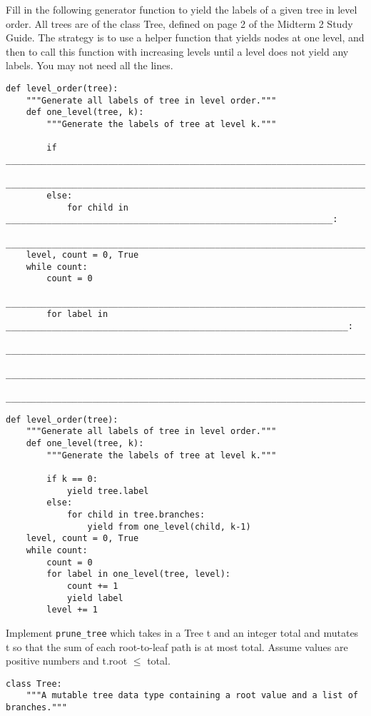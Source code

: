 \documentclass{exam}
\begin{document}
\begin{questions}
\begin{blocksection}
Fill in the following generator function to yield the labels of a given tree in level order. All trees are
of the class Tree, defined on page 2 of the Midterm 2 Study Guide. The strategy is to use a helper function
that yields nodes at one level, and then to call this function with increasing levels until a level does not yield
any labels. You may not need all the lines.
\begin{lstlisting}
def level_order(tree):
	"""Generate all labels of tree in level order."""
	def one_level(tree, k):
		"""Generate the labels of tree at level k."""
		
		if _____________________________________________________________________________:
			_____________________________________________________________________________
		else:
			for child in ________________________________________________________________:
				_________________________________________________________________________
	level, count = 0, True
	while count:
		count = 0
		________________________________________________________________________________
		for label in ___________________________________________________________________:
			____________________________________________________________________________
			____________________________________________________________________________
		________________________________________________________________________________
\end{lstlisting}
\end{blocksection}
\begin{solution}
\begin{lstlisting}
def level_order(tree):
	"""Generate all labels of tree in level order."""
	def one_level(tree, k):
		"""Generate the labels of tree at level k."""
			
		if k == 0:
			yield tree.label
		else:
			for child in tree.branches:
				yield from one_level(child, k-1)
	level, count = 0, True
	while count:
		count = 0
		for label in one_level(tree, level):
			count += 1
			yield label
		level += 1
\end{lstlisting}
\end{solution}

\begin{blocksection}
	Implement \lstinline{prune_tree} which takes in a Tree t and an integer total and mutates t so that the sum of each
	root-to-leaf path is at most total. Assume values are positive numbers and t.root $\leq$ total.
\begin{lstlisting}
class Tree:
	"""A mutable tree data type containing a root value and a list of branches."""
	

\end{lstlisting}
\end{blocksection}
\end{questions}
\end{document}

